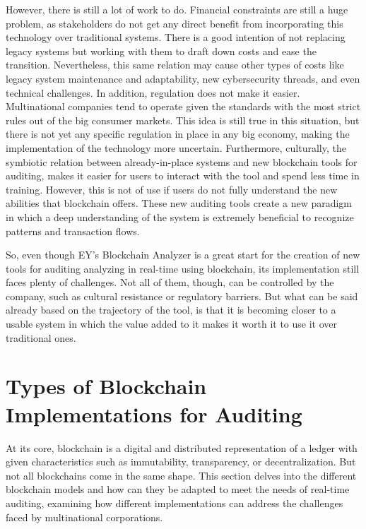 However, there is still a lot of work to do. Financial constraints are still a huge problem, as stakeholders do not get any direct benefit from incorporating this technology over traditional systems. There is a good intention of not replacing legacy systems but working with them to draft down costs and ease the transition. Nevertheless, this same relation may cause other types of costs like legacy system maintenance and adaptability, new cybersecurity threads, and even technical challenges. In addition, regulation does not make it easier. Multinational companies tend to operate given the standards with the most strict rules out of the big consumer markets. This idea is still true in this situation, but there is not yet any specific regulation in place in any big economy, making the implementation of the technology more uncertain. Furthermore, culturally, the symbiotic relation between already-in-place systems and new blockchain tools for auditing, makes it easier for users to interact with the tool and spend less time in training. However, this is not of use if users do not fully understand the new abilities that blockchain offers. These new auditing tools create a new paradigm in which a deep understanding of the system is extremely beneficial to recognize patterns and transaction flows. 

So, even though EY's Blockchain Analyzer is a great start for the creation of new tools for auditing analyzing in real-time using blockchain, its implementation still faces plenty of challenges. Not all of them, though, can be controlled by the company, such as cultural resistance or regulatory barriers. But what can be said already based on the trajectory of the tool, is that it is becoming closer to a usable system in which the value added to it makes it worth it to use it over traditional ones. 

\section{Types of Blockchain Implementations for Auditing}

At its core, blockchain is a digital and distributed representation of a ledger with given characteristics such as immutability, transparency, or decentralization. But not all blockchains come in the same shape. This section delves into the different blockchain models and how can they be adapted to meet the needs of real-time auditing, examining how different implementations can address the challenges faced by multinational corporations.

